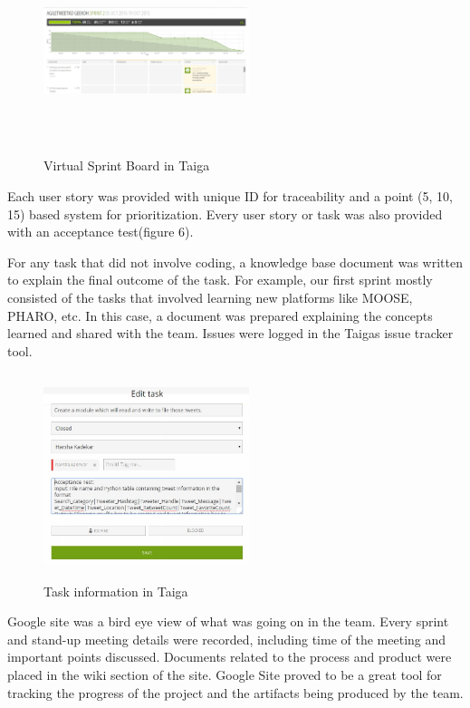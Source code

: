 \documentclass[11pt]{article}
\begin{document}
\begin{figure}[!ht]
\centering
\includegraphics[width=6cm, height=6cm]{SprintBoard.jpg}
\caption{Virtual Sprint Board in Taiga}
\end{figure}

Each user story was provided with unique ID for traceability and a point (5, 10, 15) based system for prioritization. Every user story or task was also provided with an acceptance test(figure 6).

For any task that did not involve coding, a knowledge base document was written to explain the final outcome of the task. For example, our first sprint mostly consisted of the tasks that involved learning new platforms like MOOSE, PHARO, etc. In this case, a document was prepared explaining the concepts learned and shared with the team. Issues were logged in the Taigas issue tracker tool. 

\begin{figure}[!ht]
\centering
\includegraphics[width=6cm, height=6cm]{TaskInfo.jpg}
\caption{Task information in Taiga }
\end{figure}

Google site was a bird eye view of what was going on in the team. Every sprint and stand-up meeting details were recorded, including time of the meeting and important points discussed. Documents related to the process and product were placed in the wiki section of the site. Google Site proved to be a great tool for tracking the progress of the project and the artifacts being produced by the team.
\end{document}

